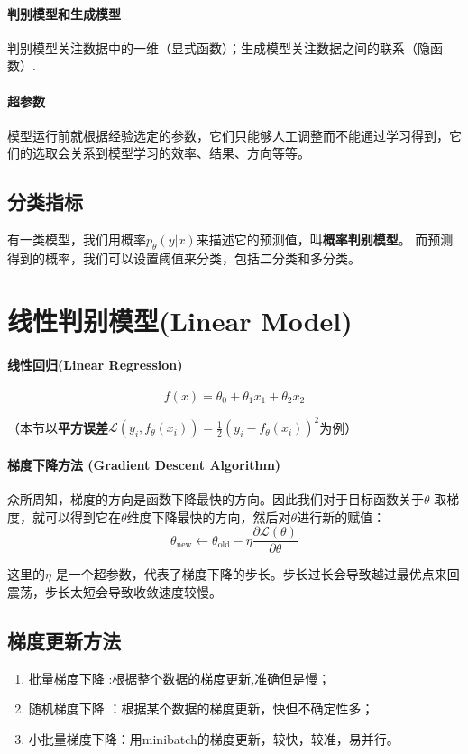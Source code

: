 \paragraph{判别模型和生成模型} 判别模型关注数据中的一维（显式函数）；生成模型关注数据之间的联系（隐函数）.

\paragraph{超参数} 模型运行前就根据经验选定的参数，它们只能够人工调整而不能通过学习得到，它们的选取会关系到模型学习的效率、结果、方向等等。
\subsection{分类指标}
有一类模型，我们用概率$p_\theta(y|x)$来描述它的预测值，叫\textbf{概率判别模型}。
而预测得到的概率，我们可以设置阈值来分类，包括二分类和多分类。

\section{线性判别模型(Linear Model)}
\paragraph{线性回归(Linear Regression)}
$$f(x) = \theta_0 + \theta_1x_1 + \theta_2x_2$$

（本节以\textbf{平方误差}$\mathcal L(y_i,f_\theta(x_i)) = \frac{1}{2}(y_i-f_\theta(x_i))^2$为例）

\paragraph{梯度下降方法 (Gradient Descent Algorithm)}
众所周知，梯度的方向是函数下降最快的方向。因此我们对于目标函数关于$\theta$ 取梯度，就可以得到它在$\theta$维度下降最快的方向，然后对$\theta$进行新的赋值：
$$\theta_\text{new} \leftarrow \theta_\text{old} - \eta\frac{\partial \mathcal L(\theta)}{\partial \theta}$$

这里的$\eta$ 是一个超参数，代表了梯度下降的步长。步长过长会导致越过最优点来回震荡，步长太短会导致收敛速度较慢。

\subsection{梯度更新方法}

\begin{enumerate}
  \item 批量梯度下降 :根据整个数据的梯度更新,准确但是慢；
  \item 随机梯度下降 ：根据某个数据的梯度更新，快但不确定性多；
  \item 小批量梯度下降：用minibatch的梯度更新，较快，较准，易并行。
\end{enumerate}

